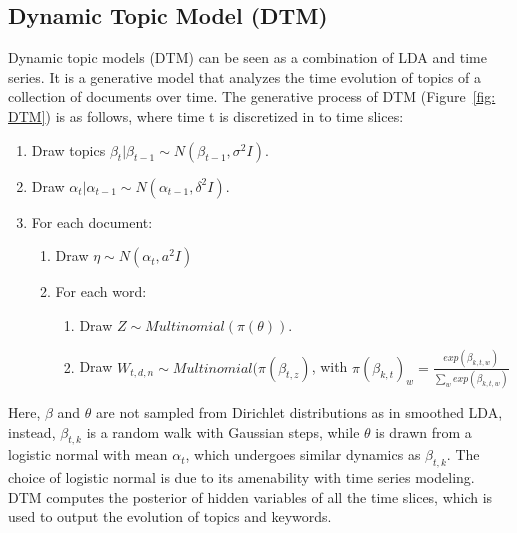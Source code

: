 \documentclass[DIV=calc, paper=letter, fontsize=10pt, twocolumn]{scrartcl}	 %
\begin{document}
\subsection*{Dynamic Topic Model (DTM)}
Dynamic topic models (DTM) \cite{3} can be seen as a combination of LDA and time series. It is a generative model that analyzes the time evolution of topics of a collection of documents over time.\newline
The generative process of DTM (Figure~\ref{fig: DTM}) is as follows, where time t is discretized in to time slices:
\begin{enumerate}
  \item Draw topics $\beta_{t} |\beta_{t - 1} \sim N(\beta_{t-1}, \sigma^2I)$.
  \item Draw $\alpha_{t} |\alpha_{t - 1} \sim N(\alpha_{t-1}, \delta^2I)$.
  \item For each document:
  	\begin{enumerate}
  	  	\item Draw $\eta \sim N(\alpha_t, a^2I)$
    		\item For each word:
			\begin{enumerate}
  	  			\item Draw $Z \sim Multinomial(\pi(\theta))$.
    				\item Draw $W_{t,d,n} \sim Multinomial(\pi(\beta_{t,z})$, with $\pi(\beta_{k,t})_w = \frac{exp(\beta_{k,t,w})}{\sum_w exp(\beta_{k,t,w})}$
			\end{enumerate}
  	\end{enumerate}
\end{enumerate}
Here, $\beta$ and $\theta$ are not sampled from Dirichlet distributions as in smoothed LDA, instead, $\beta_{t,k}$ is a random walk with Gaussian steps, while $\theta$ is drawn from a logistic normal with mean $\alpha_t$, which undergoes similar dynamics as $\beta_{t,k}$. The choice of logistic normal is due to its amenability with time series modeling. \newline
DTM computes the posterior of hidden variables of all the time slices, which is used to output the evolution of topics and keywords.
\end{document}
